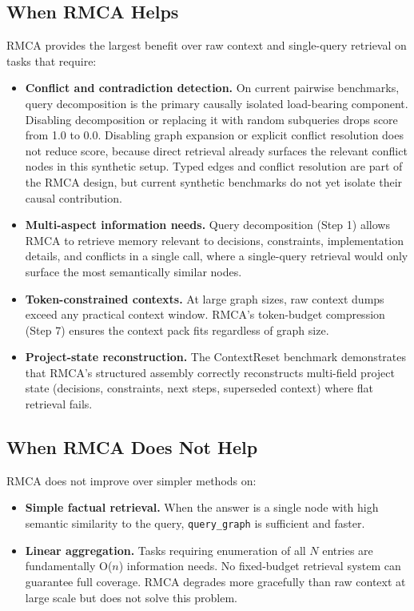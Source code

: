 \documentclass[conference]{IEEEtran}
\begin{document}
\subsection{When RMCA Helps}

RMCA provides the largest benefit over raw context and single-query retrieval on tasks
that require:
\begin{itemize}
\item \textbf{Conflict and contradiction detection.} On current pairwise benchmarks, query decomposition is the primary causally isolated load-bearing component. Disabling decomposition or replacing it with random subqueries drops score from 1.0 to 0.0. Disabling graph expansion or explicit conflict resolution does not reduce score, because direct retrieval already surfaces the relevant conflict nodes in this synthetic setup. Typed edges and conflict resolution are part of the RMCA design, but current synthetic benchmarks do not yet isolate their causal contribution.
\item \textbf{Multi-aspect information needs.} Query decomposition (Step 1) allows RMCA
to retrieve memory relevant to decisions, constraints, implementation details, and conflicts
in a single call, where a single-query retrieval would only surface the most semantically
similar nodes.
\item \textbf{Token-constrained contexts.} At large graph sizes, raw context dumps exceed
any practical context window. RMCA's token-budget compression (Step 7) ensures the context
pack fits regardless of graph size.
\item \textbf{Project-state reconstruction.} The ContextReset benchmark demonstrates that
RMCA's structured assembly correctly reconstructs multi-field project state (decisions,
constraints, next steps, superseded context) where flat retrieval fails.
\end{itemize}

\subsection{When RMCA Does Not Help}

RMCA does not improve over simpler methods on:
\begin{itemize}
\item \textbf{Simple factual retrieval.} When the answer is a single node with high
semantic similarity to the query, \texttt{query\_graph} is sufficient and faster.
\item \textbf{Linear aggregation.} Tasks requiring enumeration of all $N$ entries are
fundamentally O($n$) information needs. No fixed-budget retrieval system can guarantee
full coverage. RMCA degrades more gracefully than raw context at large scale but does not
solve this problem.
\end{itemize}
\end{document}

